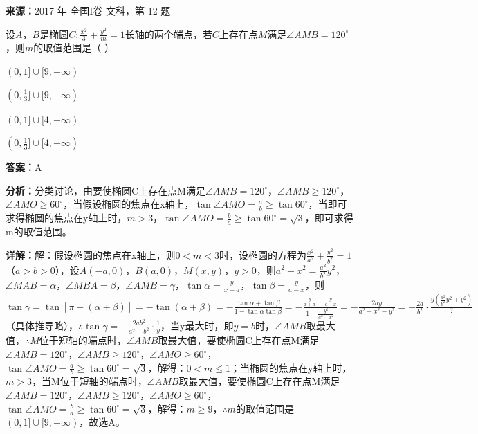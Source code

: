 \begin{question}[points=5]
\textbf{来源：}2017 年 全国I卷-文科，第 12 题\par
设$A$，$B$是椭圆$C:\frac{x^2}{3}+\frac{y^2}{m}=1$长轴的两个端点，若$C$上存在点$M$满足$\angle AMB=120^\circ$，则$m$的取值范围是（            ）
\begin{choices}
  \item $(0,1]\cup[9,+\infty)$
  \item $(0,\frac{1}{3}]\cup[9,+\infty)$
  \item $(0,1]\cup[4,+\infty)$
  \item $(0,\frac{1}{3}]\cup[4,+\infty)$
\end{choices}
\begin{solution}
\textbf{答案：}A

\textbf{分析：}分类讨论，由要使椭圆C上存在点M满足$\angle AMB=120^\circ$，$\angle AMB\ge 120^\circ$，$\angle AMO\ge 60^\circ$，当假设椭圆的焦点在x轴上，$\tan\angle AMO=\frac{a}{b}\ge\tan60^\circ$，当即可求得椭圆的焦点在y轴上时，$m>3$，$\tan\angle AMO=\frac{b}{a}\ge\tan60^\circ=\sqrt{3}$，即可求得m的取值范围。

\textbf{详解：}解：假设椭圆的焦点在x轴上，则$0<m<3$时，设椭圆的方程为$\frac{x^2}{a^2}+\frac{y^2}{b^2}=1$（$a>b>0$），设$A(-a,0)$，$B(a,0)$，$M(x,y)$，$y>0$，则$a^2-x^2=\frac{a^2}{b^2}y^2$，$\angle MAB=\alpha$，$\angle MBA=\beta$，$\angle AMB=\gamma$，$\tan\alpha=\frac{y}{x+a}$，$\tan\beta=\frac{y}{a-x}$，则$\tan\gamma=\tan[\pi-(\alpha+\beta)]=-\tan(\alpha+\beta)=-\frac{\tan\alpha+\tan\beta}{1-\tan\alpha\tan\beta}=-\frac{\frac{y}{x+a}+\frac{y}{a-x}}{1-\frac{y^2}{a^2-x^2}}=-\frac{2ay}{a^2-x^2-y^2}=-\frac{2a}{b^2}\cdot\frac{y(\frac{a^2}{b^2}y^2+y^2)}{?}$（具体推导略），$\therefore\tan\gamma=-\frac{2ab^2}{a^2-b^2}\cdot\frac{1}{y}$，当y最大时，即$y=b$时，$\angle AMB$取最大值，$\therefore M$位于短轴的端点时，$\angle AMB$取最大值，要使椭圆C上存在点M满足$\angle AMB=120^\circ$，$\angle AMB\ge 120^\circ$，$\angle AMO\ge 60^\circ$，$\tan\angle AMO=\frac{a}{b}\ge\tan60^\circ=\sqrt{3}$，解得：$0<m\le 1$；当椭圆的焦点在y轴上时，$m>3$，当M位于短轴的端点时，$\angle AMB$取最大值，要使椭圆C上存在点M满足$\angle AMB=120^\circ$，$\angle AMB\ge 120^\circ$，$\angle AMO\ge 60^\circ$，$\tan\angle AMO=\frac{b}{a}\ge\tan60^\circ=\sqrt{3}$，解得：$m\ge 9$，$\therefore m$的取值范围是$(0,1]\cup[9,+\infty)$，故选A。
\end{solution}
\end{question}

